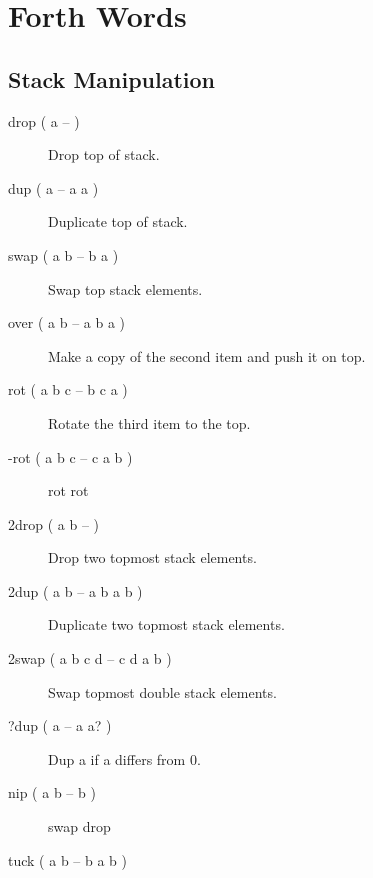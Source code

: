 \chapter{Forth Words}

\section{Stack Manipulation}

\begin{description}


\item[drop ( a -- )]

Drop top of stack.

\item[dup ( a -- a a )]

Duplicate top of stack.

\item[swap ( a b -- b a )]

Swap top stack elements.

\item[over ( a b -- a b a )]

Make a copy of the second item and push it on top.

\item[rot ( a b c -- b c a )]

Rotate the third item to the top.

\item[-rot ( a b c -- c a b )]

rot rot

\item[2drop ( a b -- )]

Drop two topmost stack elements.

\item[2dup ( a b -- a b a b )]

Duplicate two topmost stack elements.

\item[2swap ( a b c d -- c d a b )]

Swap topmost double stack elements.

\item[?dup ( a -- a a? )]

Dup a if a differs from 0.

\item[nip ( a b -- b )]

swap drop

\item[tuck ( a b -- b a b )]


\end{description}
